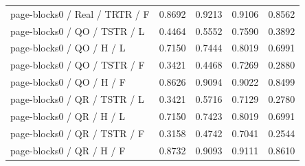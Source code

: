 \begin{longtable}{lrrrr}
page-blocks0 / Real / TRTR / F & 0.8692 & 0.9213 & 0.9106 & 0.8562 \\
page-blocks0 / QO / TSTR / L & 0.4464 & 0.5552 & 0.7590 & 0.3892 \\
page-blocks0 / QO / H / L & 0.7150 & 0.7444 & 0.8019 & 0.6991 \\
page-blocks0 / QO / TSTR / F & 0.3421 & 0.4468 & 0.7269 & 0.2880 \\
page-blocks0 / QO / H / F & 0.8626 & 0.9094 & 0.9022 & 0.8499 \\
page-blocks0 / QR / TSTR / L & 0.3421 & 0.5716 & 0.7129 & 0.2780 \\
page-blocks0 / QR / H / L & 0.7150 & 0.7423 & 0.8019 & 0.6991 \\
page-blocks0 / QR / TSTR / F & 0.3158 & 0.4742 & 0.7041 & 0.2544 \\
page-blocks0 / QR / H / F & 0.8732 & 0.9093 & 0.9111 & 0.8610 \\
\bottomrule
\end{longtable}
